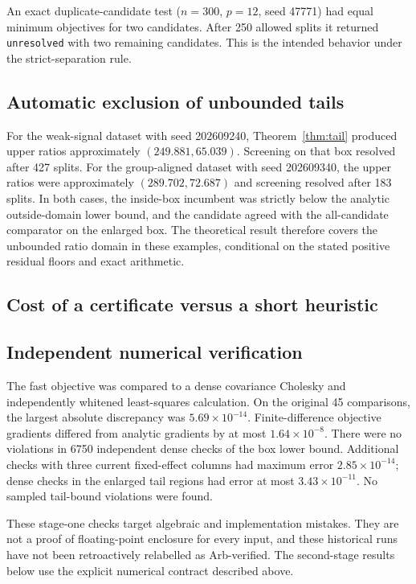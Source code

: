 \documentclass[11pt,a4paper]{article}
\theoremstyle{remark}\newtheorem{remark}[theorem]{Remark}
\begin{document}
An exact duplicate-candidate test ($n=300$, $p=12$, seed 47771) had equal minimum
objectives for two candidates. After 250 allowed splits it returned
\texttt{unresolved} with two remaining candidates. This is the intended behavior
under the strict-separation rule.

\subsection{Automatic exclusion of unbounded tails}
For the weak-signal dataset with seed 202609240, Theorem~\ref{thm:tail} produced
upper ratios approximately $(249.881,65.039)$. Screening on that box resolved
after 427 splits. For the group-aligned dataset with seed 202609340, the upper
ratios were approximately $(289.702,72.687)$ and screening resolved after 183
splits. In both cases, the inside-box incumbent was strictly below the analytic
outside-domain lower bound, and the candidate agreed with the all-candidate
comparator on the enlarged box. The theoretical result therefore covers the
unbounded ratio domain in these examples, conditional on the stated positive
residual floors and exact arithmetic.

\subsection{Cost of a certificate versus a short heuristic}


\subsection{Independent numerical verification}
The fast objective was compared to a dense covariance Cholesky and independently
whitened least-squares calculation. On the original 45 comparisons, the largest
absolute discrepancy was $5.69\times10^{-14}$. Finite-difference objective
gradients differed from analytic gradients by at most $1.64\times10^{-8}$.
There were no violations in 6750 independent dense checks of the box lower bound.
Additional checks with three current fixed-effect columns had maximum error
$2.85\times10^{-14}$; dense checks in the enlarged tail regions had error at most
$3.43\times10^{-11}$. No sampled tail-bound violations were found.

These stage-one checks target algebraic and implementation mistakes. They are not
a proof of floating-point enclosure for every input, and these historical runs
have not been retroactively relabelled as Arb-verified. The second-stage results
below use the explicit numerical contract described above.
\end{document}
